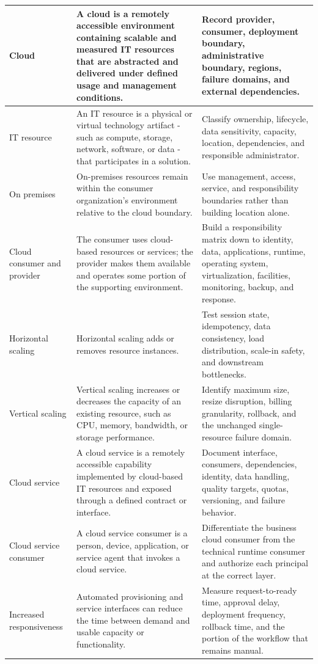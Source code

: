 \documentclass[11pt]{article}
\begin{document}
\begin{longtable}{@{}>{\RaggedRight\arraybackslash}p{}>{\RaggedRight\arraybackslash}p{}>{\RaggedRight\arraybackslash}p{}@{}}
Cloud & A cloud is a remotely accessible environment containing scalable and measured IT resources that are abstracted and delivered under defined usage and management conditions. & Record provider, consumer, deployment boundary, administrative boundary, regions, failure domains, and external dependencies. \\\midrule
IT resource & An IT resource is a physical or virtual technology artifact - such as compute, storage, network, software, or data - that participates in a solution. & Classify ownership, lifecycle, data sensitivity, capacity, location, dependencies, and responsible administrator. \\\midrule
On premises & On-premises resources remain within the consumer organization's environment relative to the cloud boundary. & Use management, access, service, and responsibility boundaries rather than building location alone. \\\midrule
Cloud consumer and provider & The consumer uses cloud-based resources or services; the provider makes them available and operates some portion of the supporting environment. & Build a responsibility matrix down to identity, data, applications, runtime, operating system, virtualization, facilities, monitoring, backup, and response. \\\midrule
Horizontal scaling & Horizontal scaling adds or removes resource instances. & Test session state, idempotency, data consistency, load distribution, scale-in safety, and downstream bottlenecks. \\\midrule
Vertical scaling & Vertical scaling increases or decreases the capacity of an existing resource, such as CPU, memory, bandwidth, or storage performance. & Identify maximum size, resize disruption, billing granularity, rollback, and the unchanged single-resource failure domain. \\\midrule
Cloud service & A cloud service is a remotely accessible capability implemented by cloud-based IT resources and exposed through a defined contract or interface. & Document interface, consumers, dependencies, identity, data handling, quality targets, quotas, versioning, and failure behavior. \\\midrule
Cloud service consumer & A cloud service consumer is a person, device, application, or service agent that invokes a cloud service. & Differentiate the business cloud consumer from the technical runtime consumer and authorize each principal at the correct layer. \\\midrule
Increased responsiveness & Automated provisioning and service interfaces can reduce the time between demand and usable capacity or functionality. & Measure request-to-ready time, approval delay, deployment frequency, rollback time, and the portion of the workflow that remains manual. \\\midrule

\end{longtable}
\end{document}
